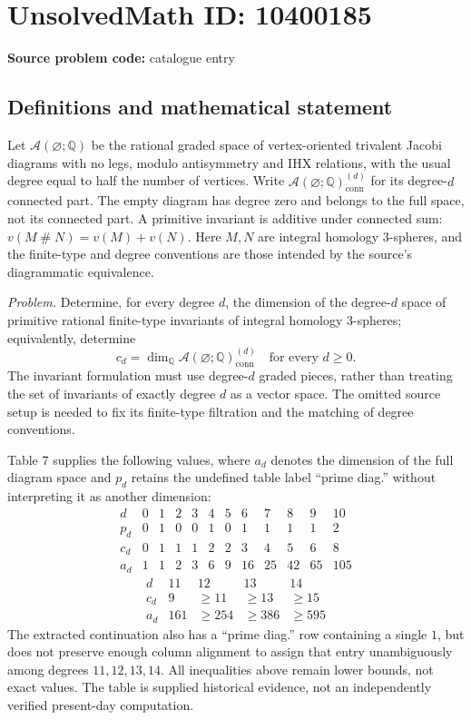 \documentclass[11pt]{article}
\newcommand{\Q}{\mathbb{Q}}
\begin{document}
\section*{UnsolvedMath ID: 10400185}
\textbf{Source problem code:} catalogue entry
\subsection{Definitions and mathematical statement}
Let \(\mathcal A(\varnothing;\Q)\) be the rational graded space of vertex-oriented trivalent Jacobi diagrams with no legs, modulo antisymmetry and IHX relations, with the usual degree equal to half the number of vertices. Write \(\mathcal A(\varnothing;\Q)^{(d)}_{\mathrm{conn}}\) for its degree-\(d\) connected part. The empty diagram has degree zero and belongs to the full space, not its connected part. A primitive invariant is additive under connected sum: \(v(M\mathbin{\#}N)=v(M)+v(N)\). Here \(M,N\) are integral homology \(3\)-spheres, and the finite-type and degree conventions are those intended by the source's diagrammatic equivalence.

\emph{Problem.} Determine, for every degree \(d\), the dimension of the degree-\(d\) space of primitive rational finite-type invariants of integral homology \(3\)-spheres; equivalently, determine
\[
 c_d=\dim_\Q\mathcal A(\varnothing;\Q)^{(d)}_{\mathrm{conn}}
 \quad\text{for every }d\geq0.
\]
The invariant formulation must use degree-\(d\) graded pieces, rather than treating the set of invariants of exactly degree \(d\) as a vector space. The omitted source setup is needed to fix its finite-type filtration and the matching of degree conventions.

Table 7 supplies the following values, where \(a_d\) denotes the dimension of the full diagram space and \(p_d\) retains the undefined table label ``prime diag.'' without interpreting it as another dimension:
\[
\begin{array}{c|rrrrrrrrrrr}
 d&0&1&2&3&4&5&6&7&8&9&10\\\hline
 p_d&0&1&0&0&1&0&1&1&1&1&2\\
 c_d&0&1&1&1&2&2&3&4&5&6&8\\
 a_d&1&1&2&3&6&9&16&25&42&65&105
\end{array}
\]
\[
\begin{array}{c|rrrr}
 d&11&12&13&14\\\hline
 c_d&9&\geq11&\geq13&\geq15\\
 a_d&161&\geq254&\geq386&\geq595
\end{array}
\]
The extracted continuation also has a ``prime diag.'' row containing a single \(1\), but does not preserve enough column alignment to assign that entry unambiguously among degrees \(11,12,13,14\). All inequalities above remain lower bounds, not exact values. The table is supplied historical evidence, not an independently verified present-day computation.
\end{document}
